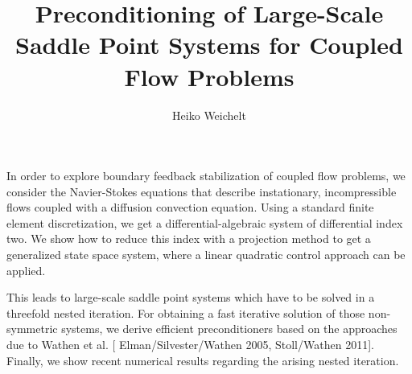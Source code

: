 \documentclass{article}
\title{Preconditioning of Large-Scale Saddle Point Systems
  for Coupled Flow Problems}
\author{Heiko Weichelt}
\affil{PhD student at Max Planck Institute for Dynamics of Complex
    Technical Systems Magdeburg, Germany}
\date{}
\begin{document}
\maketitle
\setcounter{page}{8}
In order to explore boundary feedback stabilization of coupled flow
problems, we consider the Navier-Stokes equations that describe
instationary, incompressible flows coupled with a diffusion convection
equation. Using a standard finite element discretization, we get a
differential-algebraic system of differential index two. We show how
to reduce this index with a projection method to get a generalized
state space system, where a linear quadratic control approach can be
applied.

This leads to large-scale saddle point systems which have to be solved
in a threefold nested iteration. For obtaining a fast iterative
solution of those non-symmetric systems, we derive efficient
preconditioners based on the approaches due to Wathen et al. [{\sc
  Elman/Silvester/Wathen 2005, Stoll/Wathen 2011}]. Finally, we show
recent numerical results regarding the arising nested iteration.
\end{document}
